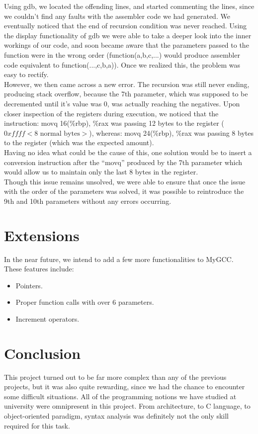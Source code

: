 \documentclass{scrartcl}
\begin{document}
Using gdb, we located the offending lines, and started commenting the lines, since we couldn't find any faults with the assembler code we had generated. We eventually noticed that the end of recursion condition was never reached. Using the display functionality of gdb we were able to take a deeper look into the inner workings of our code, and soon became aware that the parameters passed to the function were in the wrong order (function(a,b,c,...) would produce assembler code equivalent to function(...,c,b,a)). Once we realized this, the problem was easy to rectify.\\

However, we then came across a new error. The recursion was still never ending, producing stack overflow, because the 7th parameter, which was supposed to be decremented until it's value was 0, was actually reaching the negatives. Upon closer inspection of the registers during execution, we noticed that the instruction: 
movq 16(\%rbp), \%rax was passing 12 bytes to the register ($ 0xffff < \text{8 normal bytes} > $), whereas: 
movq 24(\%rbp), \%rax was passing 8 bytes to the register (which was the expected amount).\\

Having no idea what could be the cause of this, one solution would be to insert a conversion instruction after the “movq” produced by the 7th parameter which would allow us to maintain only the last 8 bytes in the register.\\

Though this issue remains unsolved, we were able to ensure that once the issue with the order of the parameters was solved, it was possible to reintroduce the 9th and 10th parameters without any errors occurring.

\section{Extensions}
In the near future, we intend to add a few more functionalities to MyGCC.\\
These features include:

\begin{itemize}
\item Pointers.
\item Proper function calls with over 6 parameters.
\item Increment operators.
\end{itemize}

\section{Conclusion}
This project turned out to be far more complex than any of the previous projects, but it was also quite rewarding, since we had the chance to encounter some difficult situations. All of the programming notions we have studied at university were omnipresent in this project. From architecture, to C language, to object-oriented paradigm, syntax analysis was definitely not the only skill required for this task.\\
\end{document}
